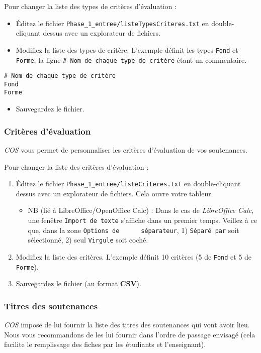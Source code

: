 \documentclass[11pt]{article}
\begin{document}
Pour changer la liste des types de critères d'évaluation :
\begin{itemize}
\item Éditez le fichier \verb~Phase_1_entree/listeTypesCriteres.txt~ en
double-cliquant dessus avec un explorateur de fichiers.
\item Modifiez la liste des types de critère. L'exemple définit les types
\verb~Fond~ et \verb~Forme~, la ligne \verb~# Nom de chaque type de critère~ étant
un commentaire.
\end{itemize}
\begin{verbatim}
# Nom de chaque type de critère
Fond
Forme
\end{verbatim}
\begin{itemize}
\item Sauvegardez le fichier.
\end{itemize}
\subsubsection{Critères d'évaluation}
\label{sec-4-1-3}
\emph{COS} vous permet de personnaliser les critères d'évaluation de vos
soutenances.

Pour changer la liste des critères d'évaluation :
\begin{enumerate}
\item Éditez le fichier \verb~Phase_1_entree/listeCriteres.txt~ en
double-cliquant dessus avec un explorateur de fichiers. Cela ouvre
votre tableur.
\begin{itemize}
\item NB (lié à LibreOffice/OpenOffice Calc) : Dans le cas de
\emph{LibreOffice Calc}, une fenêtre \verb~Import de texte~ s'affiche dans
un premier temps. Veillez à ce que, dans la zone \verb~Options de      séparateur~, 1) \verb~Séparé par~ soit sélectionné, 2) seul \verb~Virgule~
soit coché.
\end{itemize}
\item Modifiez la liste des critères. L'exemple définit 10 critères (5 de
\verb~Fond~ et 5 de \verb~Forme~).
\item Sauvegardez le fichier (au format \textbf{CSV}).
\end{enumerate}
\subsubsection{Titres des soutenances}
\label{sec-4-1-4}
\emph{COS} impose de lui fournir la liste des titres des soutenances qui
vont avoir lieu. Nous vous recommandons de les lui fournir dans
l'ordre de passage envisagé (cela facilite le remplissage des fiches
par les étudiants et l'enseignant).
\end{document}
